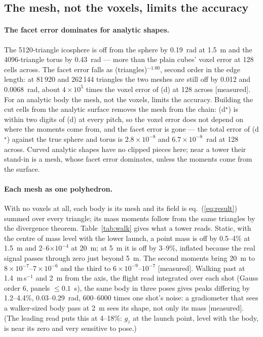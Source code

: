 \documentclass[10pt,a4paper]{article}
\newcommand{\tagM}{\textsf{\small[measured]}}
\begin{document}
\subsection{The mesh, not the voxels, limits the accuracy}\label{sec:facet}

\paragraph{The facet error dominates for analytic shapes.} The 5120-triangle icosphere is off from
the sphere by 0.19~rad at 1.5~m and the 4096-triangle torus by 0.43~rad --- more than the plain cubes'
voxel error at 128 cells across. The facet error falls as (triangles)$^{-1.00}$, second order in the
edge length: at 81\,920 and 262\,144 triangles the two meshes are still off by 0.012 and 0.0068~rad,
about $4\times10^{5}$ times the voxel error of (d) at 128 across \tagM. For an analytic body the mesh,
not the voxels, limits the accuracy. Building the cut cells from the analytic surface removes the
mesh from the chain: (d$^\star$) is within two digits of (d) at every pitch, so the voxel error does
not depend on where the moments come from, and the facet error is gone --- the total error of
(d$^\star$) against the true sphere and torus is $2.8\times10^{-8}$ and $6.7\times10^{-8}$~rad at 128
across. Curved analytic shapes have no clipped pieces here; near a tower their stand-in is a mesh, whose
facet error dominates, unless the moments come from the surface.

\paragraph{Each mesh as one polyhedron.} With no voxels at all, each body is its mesh and its field is
eq.~(\ref{eq:result}) summed over every triangle; its mass moments follow from the same triangles by
the divergence theorem. Table~\ref{tab:walk} gives what a tower reads. Static, with the centre of mass
level with the lower launch, a point mass is off by 0.5--4\% at 1.5~m and 2--6$\times10^{-4}$ at 20~m;
at 5~m it is off by 3--9\%, inflated because the real signal passes through zero just beyond 5~m. The
second moments bring 20~m to $8\times10^{-7}$--$7\times10^{-6}$ and the third to
$6\times10^{-9}$--$10^{-7}$ \tagM. Walking past at
1.4~m\,s$^{-1}$ and 2~m from the axis, the flight read integrated over each shot (Gauss order 6,
panels $\le0.1$~s), the same body in three poses gives peaks differing by 1.2--4.4\%, 0.03--0.29~rad,
600--6000 times one shot's noise: a gradiometer that sees a walker-sized body pass at 2~m sees its
shape, not only its mass \tagM. (The leading read puts this at 4--18\%: $g_z$ at the launch point,
level with the body, is near its zero and very sensitive to pose.)
\end{document}
